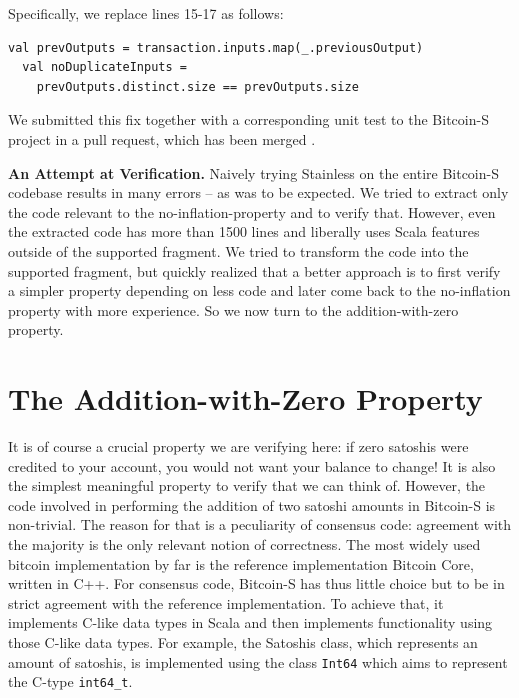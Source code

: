 \documentclass[hyphens, a4paper,USenglish,cleveref, autoref, thm-restate]{oasics-v2019}
\renewcommand{\paragraph}{\textbf}%
\begin{document}
Specifically, we replace lines 15-17 as follows:
\begin{lstlisting}[style=scala, firstnumber=15]
  val prevOutputs = transaction.inputs.map(_.previousOutput)
  val noDuplicateInputs = 
    prevOutputs.distinct.size == prevOutputs.size
\end{lstlisting}


We submitted this fix together with a corresponding unit test to the
Bitcoin-S project in a pull request, which has been merged
\cite{BitcoinS:pull435}.


\paragraph{An Attempt at Verification.} Naively trying Stainless on
the entire Bitcoin-S codebase results in many errors -- as was to be
expected. We tried to extract only the code relevant to the
no-inflation-property and to verify that. However, even the extracted
code has more than 1500 lines and liberally uses Scala features
outside of the supported fragment. We tried to transform the code into
the supported fragment, but quickly realized that a better approach is
to first verify a simpler property depending on less code and later
come back to the no-inflation property with more experience. So we now
turn to the addition-with-zero property.




\section{The Addition-with-Zero Property}

It is of course a crucial property we are verifying here: if zero
satoshis were credited to your account, you would not want your
balance to change! It is also the simplest meaningful property to
verify that we can think of. However, the code involved in performing
the addition of two satoshi amounts in Bitcoin-S is non-trivial. The
reason for that is a peculiarity of consensus code: agreement with the
majority is the only relevant notion of correctness. The most widely
used bitcoin implementation by far is the reference implementation
Bitcoin Core, written in C++. For consensus code, Bitcoin-S has thus
little choice but to be in strict agreement with the reference
implementation. To achieve that, it implements C-like data types in
Scala and then implements functionality using those C-like data
types. For example, the Satoshis class, which represents an amount of
satoshis, is implemented using the class \texttt{Int64} which aims to
represent the C-type \texttt{int64\_t}.
\end{document}
